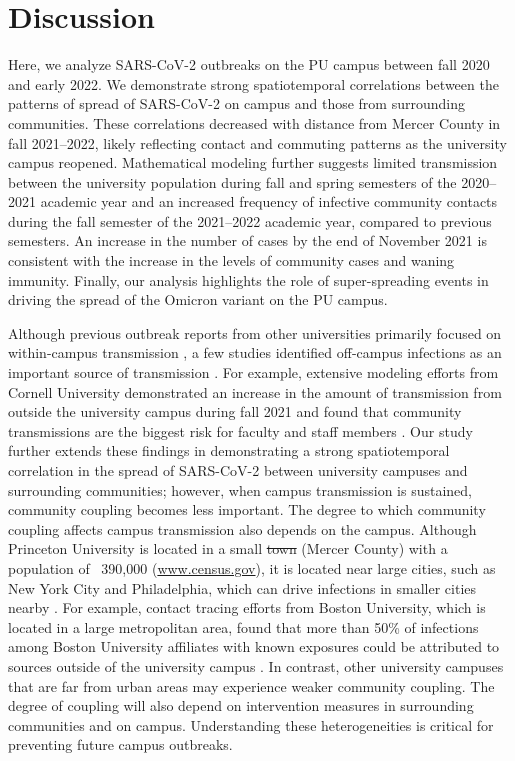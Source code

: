 \documentclass[12pt]{article}
\providecommand{\DIFaddtex}[1]{{\protect\color{blue}\uwave{#1}}} %
\providecommand{\DIFdeltex}[1]{{\protect\color{red}\sout{#1}}}                      %
\providecommand{\DIFaddbegin}{} %
\providecommand{\DIFaddend}{} %
\providecommand{\DIFdelbegin}{} %
\providecommand{\DIFdelend}{} %
\providecommand{\DIFadd}[1]{\texorpdfstring{\DIFaddtex{#1}}{#1}} %
\providecommand{\DIFdel}[1]{\texorpdfstring{\DIFdeltex{#1}}{}} %
\newcommand{\DIFscaledelfig}{0.5}
\newlength{\DIFdelgraphicswidth} %
\newlength{\DIFdelgraphicsheight} %
\newcommand{\DIFaddincludegraphics}[2][]{{\color{blue}\fbox{\DIFOincludegraphics[#1]{#2}}}} %
\newcommand{\DIFdelincludegraphics}[2][]{%
\sbox{\DIFdelgraphicsbox}{\DIFOincludegraphics[#1]{#2}}%
\settoboxwidth{\DIFdelgraphicswidth}{\DIFdelgraphicsbox} %
\settoboxtotalheight{\DIFdelgraphicsheight}{\DIFdelgraphicsbox} %
\scalebox{\DIFscaledelfig}{%
\parbox[b]{\DIFdelgraphicswidth}{\usebox{\DIFdelgraphicsbox}\\[-\baselineskip] \rule{\DIFdelgraphicswidth}{0em}}\llap{\resizebox{\DIFdelgraphicswidth}{\DIFdelgraphicsheight}{%
\setlength{\unitlength}{\DIFdelgraphicswidth}%
\begin{picture}(1,1)%
\thicklines\linethickness{2pt} %
{\color[rgb]{1,0,0}\put(0,0){\framebox(1,1){}}}%
{\color[rgb]{1,0,0}\put(0,0){\line( 1,1){1}}}%
{\color[rgb]{1,0,0}\put(0,1){\line(1,-1){1}}}%
\end{picture}%
}\hspace*{3pt}}} %
} %
\DeclareRobustCommand{\DIFaddbegin}{\DIFOaddbegin \let\includegraphics\DIFaddincludegraphics} %
\DeclareRobustCommand{\DIFaddend}{\DIFOaddend \let\includegraphics\DIFOincludegraphics} %
\DeclareRobustCommand{\DIFdelbegin}{\DIFOdelbegin \let\includegraphics\DIFdelincludegraphics} %
\DeclareRobustCommand{\DIFdelend}{\DIFOaddend \let\includegraphics\DIFOincludegraphics} %
\begin{document}
\section*{Discussion}

Here, we analyze SARS-CoV-2 outbreaks on the PU campus between fall 2020 and early 2022.
We demonstrate strong spatiotemporal correlations between the patterns of spread of SARS-CoV-2 on campus and those from surrounding communities.
These correlations decreased with distance from Mercer County in fall 2021--2022, likely reflecting contact and commuting patterns as the university campus reopened.
Mathematical modeling further suggests limited transmission between the university population during fall and spring semesters of the 2020--2021 academic year and an increased frequency of infective community contacts during the fall semester of the 2021--2022 academic year, compared to previous semesters.
An increase in the number of cases by the end of November 2021 is consistent with the increase in the levels of community cases and waning immunity.
Finally, our analysis highlights the \DIFaddbegin \DIFadd{potential }\DIFaddend role of super-spreading events in driving the spread of the Omicron variant on the PU campus.

Although previous outbreak reports from other universities primarily focused on within-campus transmission \citep{wilson2020multiple,currie2021interventions}, a few studies identified off-campus infections as an important source of transmission \citep{fox2021response,hamer2021assessment}.
For example, extensive modeling efforts from Cornell University demonstrated an increase in the amount of transmission from outside the university campus during fall 2021 and found that community transmissions are the biggest risk for faculty and staff members \citep{frazier2022modeling}.
Our study further extends these findings in demonstrating a strong spatiotemporal correlation in the spread of SARS-CoV-2 between university campuses and surrounding communities;
however, when campus transmission is sustained, community coupling becomes less important.
The degree to which community coupling affects campus transmission also depends on the campus. 
Although Princeton University is located in a small \DIFdelbegin \DIFdel{town }\DIFdelend \DIFaddbegin \DIFadd{county }\DIFaddend (Mercer County) with a population of ~390,000 (\url{www.census.gov}), it is located near large cities, such as New York City and Philadelphia, which can drive infections in smaller cities nearby \citep{grenfell1997meta}.
For example, contact tracing efforts from Boston University, which is located in a large metropolitan area, found that more than 50\% of infections among Boston University affiliates with known exposures could be attributed to sources outside of the university campus \citep{hamer2021assessment}.
In contrast, other university campuses that are far from urban areas may experience weaker community coupling.
The degree of coupling will also depend on intervention measures in surrounding communities and on campus.
Understanding these heterogeneities is critical for preventing future campus outbreaks.
\end{document}
